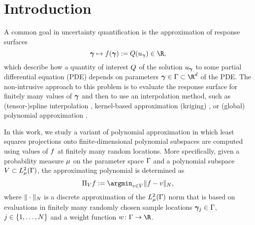 \section{Introduction}

A common goal in uncertainty quantification \cite{LeMaitreKnio2010} is the approximation of response surfaces
\begin{equation*}
\psmi\mapsto \rs(\psmi):=\QoI(\pde_{\psmi})\in\R,
\end{equation*}
which describe how a quantity of interest $Q$ of the solution $u_{\bm{\gamma}}$ to some partial differential equation (PDE) depends on parameters $\psmi\in\domPS\subset\R^\dps$ of the PDE. The non-intrusive approach to this problem is to evaluate the response surface for finitely many values of $\bm{\gamma}$ and then to use an interpolation method, such as (tensor-)spline interpolation \cite{deb2001solution}, kernel-based approximation (kriging) \cite{WolfersNobileTempone2016a,GriebelRieger2015}, or (global) polynomial approximation \cite{LeMaitreKnio2010}.

 In this work, we study a variant of polynomial approximation in which least squares projections onto finite-dimensional polynomial subspaces are computed using values of $f$ at finitely many random locations. More specifically, given a probability measure $\mu$ on the parameter space $\Gamma$ and a polynomial subspace $V\subset L^2_{\mu}(\Gamma)$, the approximating polynomial is determined as
\begin{equation}\label{eq:P0}
\P_\vsp \rs:=\argmin_{\p\in \vsp}\norm{\rs-\p}{\NS},
\end{equation}
where $\|\cdot\|_{N}$ is a discrete approximation of the $L^2_{\mu}(\Gamma)$ norm that is based on evaluations in finitely many randomly chosen sample locations $\bm{\gamma}_j\in\Gamma$, $j\in\{1,\dots,N\}$ and a weight function $\weight\colon\domPS\to\R$. 


